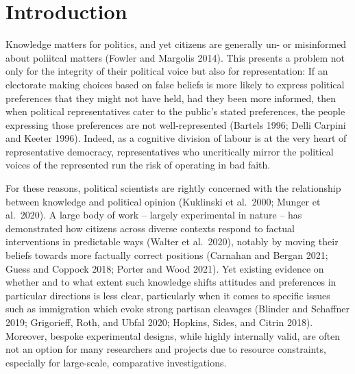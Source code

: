 \documentclass[11pt,halfline,a4paper,]{ouparticle}
\begin{document}
\date{\today}


\maketitle



\hypertarget{introduction}{%
\section{Introduction}\label{introduction}}

Knowledge matters for politics, and yet citizens are generally un- or
misinformed about poliitcal matters (Fowler and Margolis 2014). This
presents a problem not only for the integrity of their political voice
but also for representation: If an electorate making choices based on
false beliefs is more likely to express political preferences that they
might not have held, had they been more informed, then when political
representatives cater to the public's stated preferences, the people
expressing those preferences are not well-represented (Bartels 1996;
Delli Carpini and Keeter 1996). Indeed, as a cognitive division of
labour is at the very heart of representative democracy, representatives
who uncritically mirror the political voices of the represented run the
risk of operating in bad faith.

For these reasons, political scientists are rightly concerned with the
relationship between knowledge and political opinion (Kuklinski et
al.~2000; Munger et al.~2020). A large body of work -- largely
experimental in nature -- has demonstrated how citizens across diverse
contexts respond to factual interventions in predictable ways (Walter et
al.~2020), notably by moving their beliefs towards more factually
correct positions (Carnahan and Bergan 2021; Guess and Coppock 2018;
Porter and Wood 2021). Yet existing evidence on whether and to what
extent such knowledge shifts attitudes and preferences in particular
directions is less clear, particularly when it comes to specific issues
such as immigration which evoke strong partisan cleavages (Blinder and
Schaffner 2019; Grigorieff, Roth, and Ubfal 2020; Hopkins, Sides, and
Citrin 2018). Moreover, bespoke experimental designs, while highly
internally valid, are often not an option for many researchers and
projects due to resource constraints, especially for large-scale,
comparative investigations.
\end{document}
